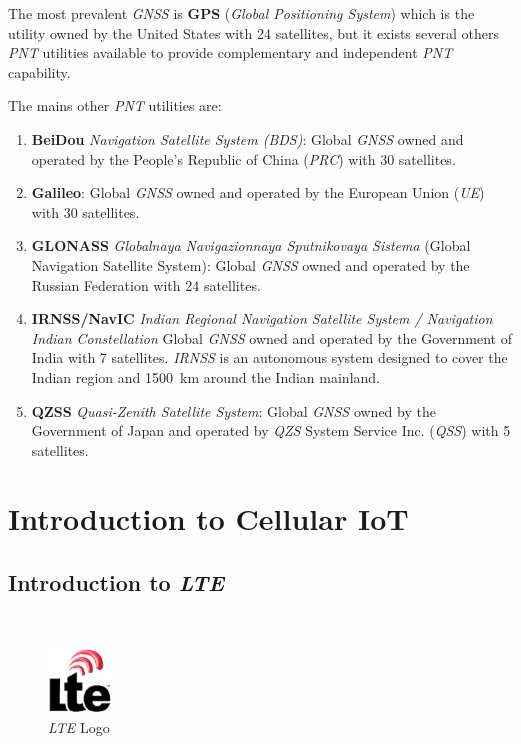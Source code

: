 \documentclass[report.tex]{subfiles}
\begin{document}
The most prevalent \textit{GNSS} is \textbf{GPS} (\textit{Global Positioning System}) which is the utility owned by the United States with 24 satellites, but it exists several others \textit{PNT} utilities available to provide complementary and independent \textit{PNT} capability.

\begin{flushleft}
The mains other \textit{PNT} utilities are:
\end{flushleft}

\begin{enumerate}
\item \textbf{BeiDou} \textit{Navigation Satellite System (BDS)}: Global \textit{GNSS} owned and operated by the People's Republic of China (\textit{PRC}) with 30 satellites.
\item \textbf{Galileo}: Global \textit{GNSS} owned and operated by the European Union (\textit{UE}) with 30 satellites.
\item \textbf{GLONASS} \textit{Globalnaya Navigazionnaya Sputnikovaya Sistema} (Global Navigation Satellite System): Global \textit{GNSS} owned and operated by the Russian Federation with 24 satellites.
\item \textbf{IRNSS/NavIC} \textit{Indian Regional Navigation Satellite System / Navigation Indian Constellation} Global \textit{GNSS} owned and operated by the Government of India with 7 satellites. \textit{IRNSS} is an autonomous system designed to cover the Indian region and \SI{1500}{\kilo\meter} around the Indian mainland.
\item \textbf{QZSS} \textit{Quasi-Zenith Satellite System}: Global \textit{GNSS} owned by the Government of Japan and operated by \textit{QZS} System Service Inc. (\textit{QSS}) with 5 satellites.
\end{enumerate}

\section{Introduction to Cellular IoT}

\subsection{Introduction to \textit{LTE}}
\;\\[-35pt]
\begin{figure}[H]
\centering
\includegraphics[width=0.15\textwidth]{Include/Figure/research/3GPP_LTE_logo.png}
\caption{\textit{LTE} Logo\cite{LTE}}
\label{fig:ltelogo}
\end{figure}
\end{document}
